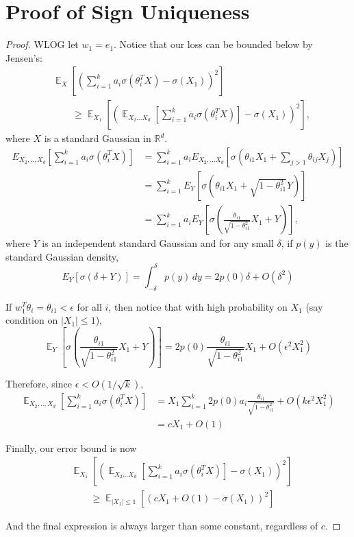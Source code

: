 \documentclass{article}
\newcommand{\R}{{\mathbb{R}}}
\DeclareMathOperator*{\expt}{\mathbb{E}}
\newcommand{\EE}[2]{{\expt_{#1}{#2}}}
\begin{document}
\section{Proof of Sign Uniqueness}



\begin{proof}
WLOG let $w_1 = e_1$. Notice that our loss can be bounded below by Jensen's:
%
\begin{align*}
& \expt_X \left[ \left( \sum_{i=1}^k a_i \sigma(\theta_i^TX) - \sigma(X_1)\right)^2 \right] \\
& \qquad 
\geq \expt_{X_1} \left[ \left( \EE{X_2...X_d}{\left[ \sum_{i=1}^k a_i \sigma(\theta_i^TX) \right]}- \sigma(X_1)\right)^2 \right],
\end{align*}
where $X$ is a standard Gaussian in $\R^d$. 
%
\begin{align*}
E_{X_2,..,X_d} \left[  \sum_{i=1}^k a_i \sigma(\theta_i^TX) \right] &= \sum_{i=1}^k a_i E_{X_2,...X_d}\left[  \sigma(\theta_{i1}X_1 + \sum_{j >1} \theta_{ij}X_{j})  \right]\\
&= \sum_{i=1}^k E_{Y} \left[   \sigma(\theta_{i1}X_1 + \sqrt{1-\theta_{i1}^2}Y)  \right]  \\
&= \sum_{i=1}^k a_i E_{Y} \left[   \sigma(\textstyle\frac{\theta_{i1}}{\sqrt{1-\theta_{i1}^2}}X_1 + Y)  \right] ,
\end{align*}
where $Y$ is an independent standard Gaussian and for any small $\delta$, if $p(y)$ is the standard Gaussian density, 
%
\[ E_Y[\sigma(\delta + Y)] = \int_{-\delta}^{\delta} p(y) \, dy = 2p(0)\delta + O(\delta^2) \]

If $w_1^T\theta_i = \theta_{i1} < \epsilon$ for all $i$, then notice that with high probability on $X_1$ (say condition on $|X_1| \leq 1$), 
%
\[\expt_{Y} \left[   \sigma(\textstyle\frac{\theta_{i1}}{\sqrt{1-\theta_{i1}^2}}X_1 + Y)  \right] = 2p(0)\textstyle\frac{\theta_{i1}}{\sqrt{1-\theta_{i1}^2}}X_1 + O(\epsilon^2X_1^2)\]

Therefore, since $\epsilon < O(1/\sqrt{k})$,
%
\begin{align*}
\expt_{X_2,..,X_d} \left[  \sum_{i=1}^k a_i \sigma(\theta_i^TX)
  \right]  & = X_1
  \sum_{i=1}^k2p(0)a_i\textstyle\frac{\theta_{i1}}{\sqrt{1-\theta_{i1}^2}}
  + O(k\epsilon^2X_1^2) \\
& = cX_1+O(1)
\end{align*}


Finally, our error bound is now
%
\begin{align*}
& \expt_{X_1} \left[ \left( \expt_{X_2...X_d}\left[ \sum_{i=1}^k a_i
      \sigma(\theta_i^TX) \right]- \sigma(X_1)\right)^2 \right] \\
& \qquad \geq
\expt_{|X_1| \leq 1}[(cX_1+O(1) - \sigma(X_1))^2]
\end{align*}

And the final expression is always larger than some constant, regardless of $c$.
\end{proof}
\end{document}
